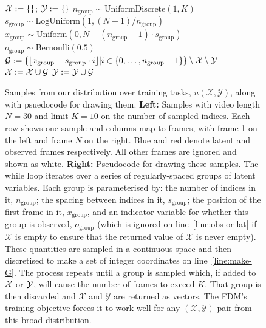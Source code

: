 \begin{figure}
\begin{minipage}[t]{0.65\textwidth}
\begin{algorithm}[H]
\begin{algorithmic}[1]
      \State $\mathcal{X} := \{\}$; $\mathcal{Y} := \{\}$
        \State $n_\text{group} \sim \text{UniformDiscrete}(1, K)$ %
        \State $s_\text{group} \sim \text{LogUniform}(1, (N-1)/n_\text{group})$ %
        \State $x_\text{group} \sim \text{Uniform}(0, N-(n_\text{group}-1)\cdot s_\text{group})$ %
        \State $o_\text{group} \sim \text{Bernoulli}(0.5)$
        \State $\mathcal{G} := \{\lfloor x_\text{group} + s_\text{group} \cdot i \rfloor | i \in \{0,\ldots,n_\text{group}-1\} \} \setminus \mathcal{X} \setminus \mathcal{Y}$ \label{line:make-G}
            \State {}
         \label{line:obs-or-lat}
            \State $\mathcal{X} := \mathcal{X} \cup \mathcal{G}$
        \Else
            \State $\mathcal{Y} := \mathcal{Y} \cup \mathcal{G}$
        \EndIf
    \EndWhile
    \end{algorithmic}
\end{algorithm}
\end{minipage}
\caption{Samples from our distribution over training tasks, $u(\mathcal{X},\mathcal{Y})$, along with psuedocode for drawing them. \textbf{Left:} Samples with video length $N=30$ and limit $K=10$ on the number of sampled indices. Each row shows one sample and columns map to frames, with frame 1 on the left and frame $N$ on the right. Blue and red denote latent and observed frames respectively. All other frames are ignored and shown as white. \textbf{Right:} Pseudocode for drawing these samples. The while loop iterates over a series of regularly-spaced groups of latent variables. Each group is parameterised by: the number of indices in it, $n_\text{group}$; the spacing between indices in it, $s_\text{group}$; the position of the first frame in it, $x_\text{group}$, and an indicator variable for whether this group is observed, $o_\text{group}$ (which is ignored on line~\ref{line:obs-or-lat} if $\mathcal{X}$ is empty to ensure that the returned value of $\mathcal{X}$ is never empty). These quantities are sampled in a continuous space and then discretised to make a set of integer coordinates on line~\ref{line:make-G}. The process repeats until a group is sampled which, if added to $\mathcal{X}$ or $\mathcal{Y}$, will cause the number of frames to exceed $K$. That group is then discarded and $\mathcal{X}$ and $\mathcal{Y}$ are returned as vectors. The FDM's training objective forces it to work well for any $(\mathcal{X},\mathcal{Y})$ pair from this broad distribution.
}
\label{fig:training-distribution}
\end{figure}

